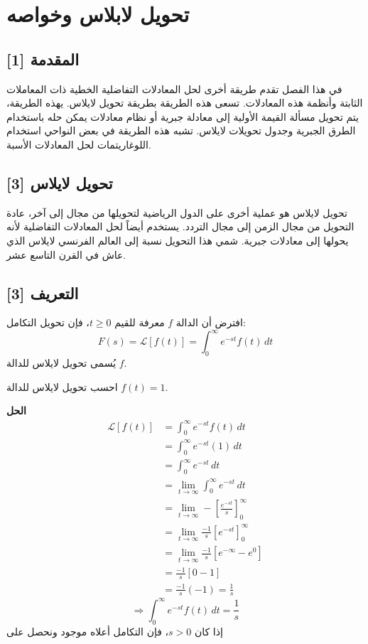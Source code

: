 \chapter{تحويل لابلاس وخواصه}

\section*{المقدمة [1]}
في هذا الفصل تقدم طريقة أخرى لحل المعادلات التفاضلية الخطية ذات المعاملات الثابتة وأنظمة هذه المعادلات. تسعى هذه الطريقة بطريقة تحويل لايلاس. يهذه الطريقة، يتم تحويل مسألة القيمة الأولية إلى معادلة جبرية أو نظام معادلات يمكن حله باستخدام الطرق الجبرية وجدول تحويلات لايلاس. تشبه هذه الطريقة في بعض النواحي استخدام اللوغاريتمات لحل المعادلات الأسبة.

\section[تحويل لابلاس]{ تحويل لايلاس [3]}
تحويل لايلاس هو عملية أخرى على الدول الرياضية لتحويلها من مجال إلى آخر، عادة التحويل من مجال الزمن إلى مجال التردد. يستخدم أيضاً لحل المعادلات التفاضلية لأنه يحولها إلى معادلات جبرية. شمي هذا التحويل نسبة إلى العالم الفرنسي لايلاس الذي عاش في القرن التاسع عشر.

\section[التعريف]{التعريف [3]}
افترض أن الدالة \( f \) معرفة للقيم \( t \geq 0 \)، فإن تحويل التكامل:
\begin{equation}
	F(s) = \mathcal{L}[f(t)] = \int_{0}^{\infty} e^{-st}f(t) \, dt
\end{equation}
يُسمى تحويل لايلاس للدالة \( f \).

\begin{example}
احسب تحويل لايلاس للدالة \( f(t) = 1 \).
\end{example}
\noindent
\textbf{الحل}
\begin{align*}
\mathcal{L}[f(t)] &= \int_{0}^{\infty} e^{-st}f(t) \, dt
\\
&= \int_{0}^{\infty} e^{-st}(1) \, dt
\\
&= \int_{0}^{\infty} e^{-st} \, dt
\\
&= \lim_{t \to \infty} \int_0^\infty e^{-st} \, dt
\\
&= \lim_{t \to \infty} - \left[ \frac{e^{-st}}{s} \right]_0^\infty
\\
&= \lim_{t \to \infty} \frac{-1}{s} \left[ e^{-st} \right]_0^\infty
\\
&= \lim_{t \to \infty} \frac{-1}{s} \left[ e^{-\infty} - e^0 \right]
\\
&= \frac{-1}{s} \left[ 0 - 1 \right]
\\
&= \frac{-1}{s} (-1) = \frac{1}{s}
\end{align*}
\[
\Rightarrow\int_0^\infty e^{-st} f(t) \, dt = \frac{1}{s}
\]
\noindent
إذا كان \( s > 0 \)، فإن التكامل أعلاه موجود ونحصل على
